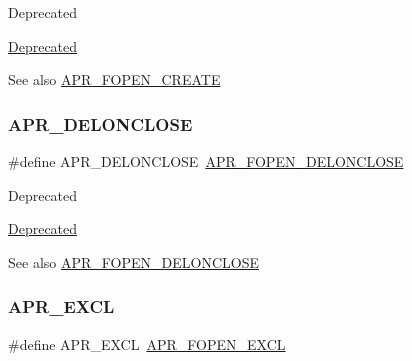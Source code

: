 \begin{DoxyRefDesc}{Deprecated}
\item[\mbox{\hyperlink{deprecated__deprecated000019}{Deprecated}}]\end{DoxyRefDesc}
\begin{DoxySeeAlso}{See also}
\mbox{\hyperlink{group__apr__file__open__flags_gafe94f21ccbf411172e70e7f473af251a}{A\+P\+R\+\_\+\+F\+O\+P\+E\+N\+\_\+\+C\+R\+E\+A\+TE}} 
\end{DoxySeeAlso}
\mbox{\label{group__apr__file__open__flags_gaebc7f034a72dffe64858b1b9451994ff}} 
\subsubsection{\texorpdfstring{A\+P\+R\+\_\+\+D\+E\+L\+O\+N\+C\+L\+O\+SE}{APR\_DELONCLOSE}}
{\footnotesize\ttfamily \#define A\+P\+R\+\_\+\+D\+E\+L\+O\+N\+C\+L\+O\+SE~\mbox{\hyperlink{group__apr__file__open__flags_ga5d3756f6d242c667ed1d3f54af4916eb}{A\+P\+R\+\_\+\+F\+O\+P\+E\+N\+\_\+\+D\+E\+L\+O\+N\+C\+L\+O\+SE}}}

\begin{DoxyRefDesc}{Deprecated}
\item[\mbox{\hyperlink{deprecated__deprecated000025}{Deprecated}}]\end{DoxyRefDesc}
\begin{DoxySeeAlso}{See also}
\mbox{\hyperlink{group__apr__file__open__flags_ga5d3756f6d242c667ed1d3f54af4916eb}{A\+P\+R\+\_\+\+F\+O\+P\+E\+N\+\_\+\+D\+E\+L\+O\+N\+C\+L\+O\+SE}} 
\end{DoxySeeAlso}
\mbox{\label{group__apr__file__open__flags_ga209c26b2b903cc23417f6781d4edf891}} 
\subsubsection{\texorpdfstring{A\+P\+R\+\_\+\+E\+X\+CL}{APR\_EXCL}}
{\footnotesize\ttfamily \#define A\+P\+R\+\_\+\+E\+X\+CL~\mbox{\hyperlink{group__apr__file__open__flags_gabb7fb062cdf1d58faee8c7ea518496f1}{A\+P\+R\+\_\+\+F\+O\+P\+E\+N\+\_\+\+E\+X\+CL}}}

